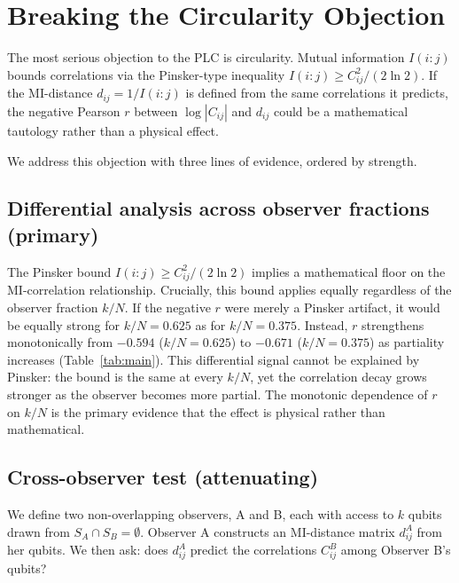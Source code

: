 \documentclass[aps,pra,twocolumn,superscriptaddress]{revtex4-2}
\begin{document}
\section{Breaking the Circularity Objection}
\label{sec:circularity}

The most serious objection to the PLC is circularity. Mutual information $I(i{:}j)$ bounds correlations via the Pinsker-type inequality $I(i{:}j) \geq C_{ij}^2 / (2\ln 2)$. If the MI-distance $d_{ij} = 1/I(i{:}j)$ is defined from the same correlations it predicts, the negative Pearson $r$ between $\log|C_{ij}|$ and $d_{ij}$ could be a mathematical tautology rather than a physical effect.

We address this objection with three lines of evidence, ordered by strength.

\subsection{Differential analysis across observer fractions (primary)}

The Pinsker bound $I(i{:}j) \geq C_{ij}^2/(2\ln 2)$ implies a mathematical floor on the MI-correlation relationship. Crucially, this bound applies equally regardless of the observer fraction $k/N$. If the negative $r$ were merely a Pinsker artifact, it would be equally strong for $k/N = 0.625$ as for $k/N = 0.375$. Instead, $r$ strengthens monotonically from $-0.594$ ($k/N = 0.625$) to $-0.671$ ($k/N = 0.375$) as partiality increases (Table~\ref{tab:main}). This differential signal cannot be explained by Pinsker: the bound is the same at every $k/N$, yet the correlation decay grows stronger as the observer becomes more partial. The monotonic dependence of $r$ on $k/N$ is the primary evidence that the effect is physical rather than mathematical.

\subsection{Cross-observer test (attenuating)}

We define two non-overlapping observers, A and B, each with access to $k$ qubits drawn from $S_A \cap S_B = \emptyset$. Observer A constructs an MI-distance matrix $d^A_{ij}$ from her qubits. We then ask: does $d^A_{ij}$ predict the correlations $C^B_{ij}$ among Observer B's qubits?
\end{document}

